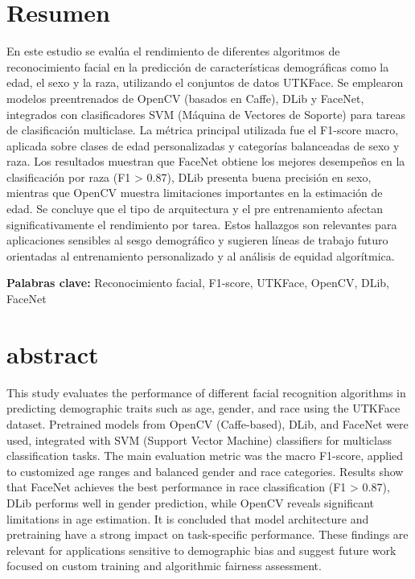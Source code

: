 \section{Resumen}

En este estudio se evalúa el rendimiento de diferentes algoritmos de reconocimiento facial en la predicción de características demográficas como la edad, el sexo y la raza, utilizando el conjuntos de datos UTKFace. Se emplearon modelos preentrenados de OpenCV (basados en Caffe), DLib y FaceNet, integrados con clasificadores SVM (Máquina de Vectores de Soporte) para tareas de clasificación multiclase. La métrica principal utilizada fue el F1-score macro, aplicada sobre clases de edad personalizadas y categorías balanceadas de sexo y raza. Los resultados muestran que FaceNet obtiene los mejores desempeños en la clasificación por raza (F1 > 0.87), DLib presenta buena precisión en sexo, mientras que OpenCV muestra limitaciones importantes en la estimación de edad. Se concluye que el tipo de arquitectura y el pre entrenamiento afectan significativamente el rendimiento por tarea. Estos hallazgos son relevantes para aplicaciones sensibles al sesgo demográfico y sugieren líneas de trabajo futuro orientadas al entrenamiento personalizado y al análisis de equidad algorítmica.

\textbf{Palabras clave:} Reconocimiento facial, F1-score, UTKFace, OpenCV, DLib, FaceNet

\section{abstract}
This study evaluates the performance of different facial recognition algorithms in predicting demographic traits such as age, gender, and race using the UTKFace dataset. Pretrained models from OpenCV (Caffe-based), DLib, and FaceNet were used, integrated with SVM (Support Vector Machine) classifiers for multiclass classification tasks. The main evaluation metric was the macro F1-score, applied to customized age ranges and balanced gender and race categories. Results show that FaceNet achieves the best performance in race classification (F1 > 0.87), DLib performs well in gender prediction, while OpenCV reveals significant limitations in age estimation. It is concluded that model architecture and pretraining have a strong impact on task-specific performance. These findings are relevant for applications sensitive to demographic bias and suggest future work focused on custom training and algorithmic fairness assessment.

